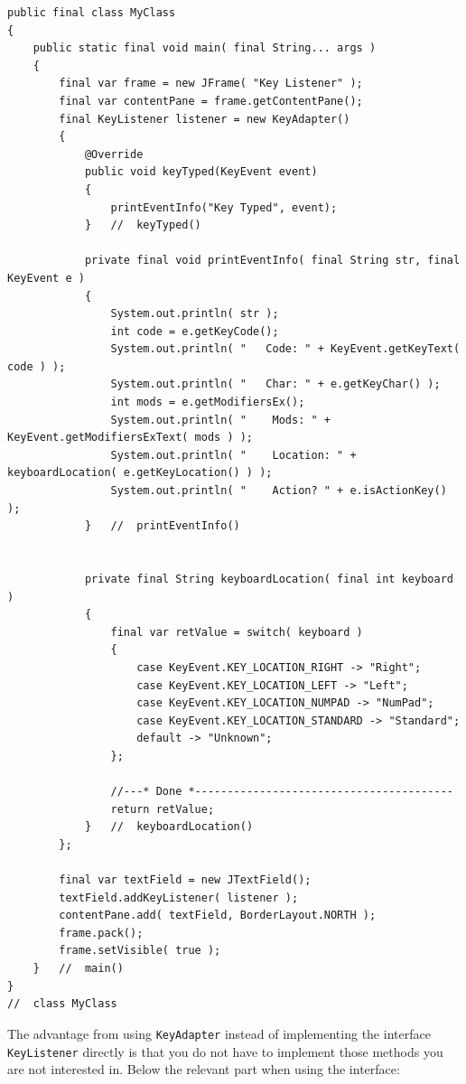 \begin{lstlisting}
public final class MyClass 
{
    public static final void main( final String... args ) 
    {
        final var frame = new JFrame( "Key Listener" );
        final var contentPane = frame.getContentPane();
        final KeyListener listener = new KeyAdapter() 
        {
            @Override
            public void keyTyped(KeyEvent event) 
            {
                printEventInfo("Key Typed", event);
            }	//	keyTyped()
            
            private final void printEventInfo( final String str, final KeyEvent e ) 
            {
                System.out.println( str );
                int code = e.getKeyCode();
                System.out.println( "   Code: " + KeyEvent.getKeyText( code ) );
                System.out.println( "   Char: " + e.getKeyChar() );
                int mods = e.getModifiersEx();
                System.out.println( "    Mods: " + KeyEvent.getModifiersExText( mods ) );
                System.out.println( "    Location: " + keyboardLocation( e.getKeyLocation() ) );
                System.out.println( "    Action? " + e.isActionKey() );
            }   //  printEventInfo()
            
            
            private final String keyboardLocation( final int keyboard ) 
            {
                final var retValue = switch( keyboard ) 
                {
                    case KeyEvent.KEY_LOCATION_RIGHT -> "Right";
                    case KeyEvent.KEY_LOCATION_LEFT -> "Left";
                    case KeyEvent.KEY_LOCATION_NUMPAD -> "NumPad";
                    case KeyEvent.KEY_LOCATION_STANDARD -> "Standard";
                    default -> "Unknown";
                };
                
                //---* Done *----------------------------------------
                return retValue;
            }	//	keyboardLocation()
        };
        
        final var textField = new JTextField();
        textField.addKeyListener( listener );
        contentPane.add( textField, BorderLayout.NORTH );
        frame.pack();
        frame.setVisible( true );
    }   //  main()
}
//  class MyClass
\end{lstlisting}

The advantage from using \lstinline|KeyAdapter| instead of implementing the interface \lstinline|KeyListener| directly is that you do not have to implement those methods you are not interested in. Below the relevant part when using the interface:

